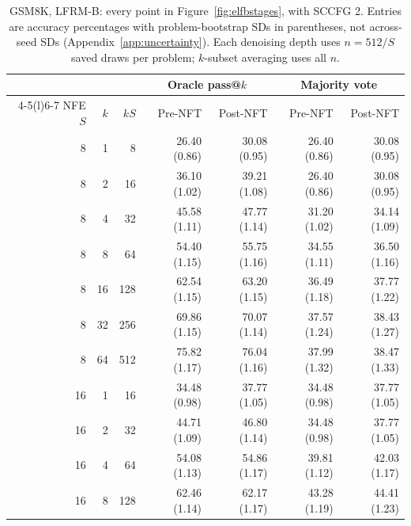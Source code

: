 \documentclass{article}
\begin{document}
\begin{table}[!htbp]
\caption{GSM8K, LFRM-B: every point in Figure~\ref{fig:elfbstages}, with SCCFG 2. Entries are accuracy percentages with problem-bootstrap SDs in parentheses, not across-seed SDs (Appendix~\ref{app:uncertainty}). Each denoising depth uses $n=512/S$ saved draws per problem; $k$-subset averaging uses all $n$.}
\label{tab:budgetvaluesgsmb}
\centering\small
\setlength{\tabcolsep}{5pt}
\begin{tabular}{@{}rrr rrrr@{}}
\toprule
& & & \multicolumn{2}{c}{Oracle pass@$k$} & \multicolumn{2}{c}{Majority vote} \\
\cmidrule(lr){4-5}\cmidrule(l){6-7}
NFE $S$ & $k$ & $kS$ & Pre-NFT & Post-NFT & Pre-NFT & Post-NFT \\
\midrule
8 & 1 & 8 & 26.40 {\scriptsize (0.86)} & 30.08 {\scriptsize (0.95)} & 26.40 {\scriptsize (0.86)} & 30.08 {\scriptsize (0.95)} \\
8 & 2 & 16 & 36.10 {\scriptsize (1.02)} & 39.21 {\scriptsize (1.08)} & 26.40 {\scriptsize (0.86)} & 30.08 {\scriptsize (0.95)} \\
8 & 4 & 32 & 45.58 {\scriptsize (1.11)} & 47.77 {\scriptsize (1.14)} & 31.20 {\scriptsize (1.02)} & 34.14 {\scriptsize (1.09)} \\
8 & 8 & 64 & 54.40 {\scriptsize (1.15)} & 55.75 {\scriptsize (1.16)} & 34.55 {\scriptsize (1.11)} & 36.50 {\scriptsize (1.16)} \\
8 & 16 & 128 & 62.54 {\scriptsize (1.15)} & 63.20 {\scriptsize (1.15)} & 36.49 {\scriptsize (1.18)} & 37.77 {\scriptsize (1.22)} \\
8 & 32 & 256 & 69.86 {\scriptsize (1.15)} & 70.07 {\scriptsize (1.14)} & 37.57 {\scriptsize (1.24)} & 38.43 {\scriptsize (1.27)} \\
8 & 64 & 512 & 75.82 {\scriptsize (1.17)} & 76.04 {\scriptsize (1.16)} & 37.99 {\scriptsize (1.32)} & 38.47 {\scriptsize (1.33)} \\
\midrule
16 & 1 & 16 & 34.48 {\scriptsize (0.98)} & 37.77 {\scriptsize (1.05)} & 34.48 {\scriptsize (0.98)} & 37.77 {\scriptsize (1.05)} \\
16 & 2 & 32 & 44.71 {\scriptsize (1.09)} & 46.80 {\scriptsize (1.14)} & 34.48 {\scriptsize (0.98)} & 37.77 {\scriptsize (1.05)} \\
16 & 4 & 64 & 54.08 {\scriptsize (1.13)} & 54.86 {\scriptsize (1.17)} & 39.81 {\scriptsize (1.12)} & 42.03 {\scriptsize (1.17)} \\
16 & 8 & 128 & 62.46 {\scriptsize (1.14)} & 62.17 {\scriptsize (1.17)} & 43.28 {\scriptsize (1.19)} & 44.41 {\scriptsize (1.23)} \\

\end{tabular}
\end{table}
\end{document}

